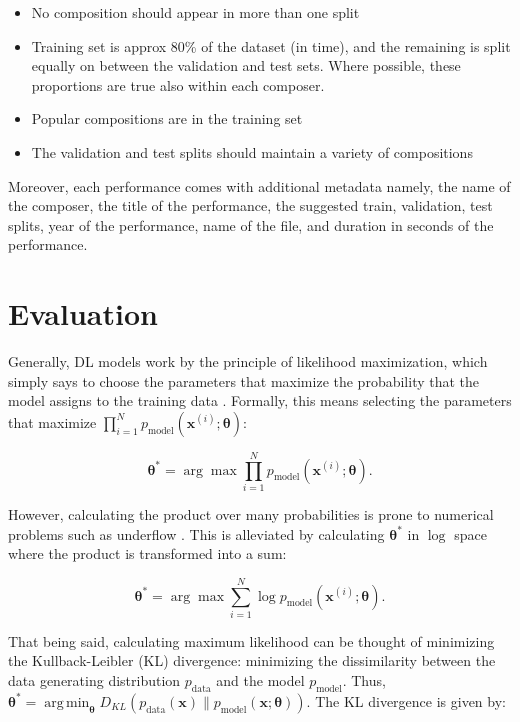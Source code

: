 \documentclass[a4paper]{book}
\DeclareMathOperator*{\argmin}{arg\,min}
\begin{document}
\begin{itemize}
    \item No composition should appear in more than one split
    \item Training set is approx 80\% of the dataset (in time), and the remaining is split equally on between the validation and test sets. Where possible, these proportions are true also within each composer.
    \item Popular compositions are in the training set
    \item The validation and test splits should maintain a variety of compositions
\end{itemize}

Moreover, each performance comes with additional metadata namely, the name of the composer, the title of the performance, the suggested train, validation, test splits, year of the performance, name of the file, and duration in seconds of the performance.

\section{Evaluation}

Generally, DL models work by the principle of likelihood maximization, which simply says to choose the parameters that maximize the probability that the model assigns to the training data \parencite{goodfellow_nips_2016}. Formally, this means selecting the parameters that maximize $\prod_{i=1}^N p_{\text{model}}(\bm{x}^{(i)}; \bm{\theta})$:

\begin{equation}
    \bm{\theta^*} = \arg \max \prod_{i=1}^N p_{\text{model}}(\bm{x}^{(i)}; \bm{\theta}) \label{eq:og_mle}.
\end{equation}

However, calculating the product over many probabilities is prone to numerical problems such as underflow \parencite{goodfellow_nips_2016}. This is alleviated by calculating $\bm{\theta^*}$ in $\log$ space where the product is transformed into a sum:

\begin{equation}
    \bm{\theta^*} = \arg \max \sum_{i=1}^N \log p_{\text{model}}(\bm{x}^{(i)}; \bm{\theta}) \label{eg:log_mle}.
\end{equation}

That being said, calculating maximum likelihood can be thought of minimizing the Kullback-Leibler (KL) divergence: minimizing the dissimilarity between the data generating distribution $p_{\text{data}}$ and the model $p_{\text{model}}$. Thus, $\bm{\theta^*} = \argmin_{\bm{\theta}} D_{KL}(p_{\text{data}}(\bm{x}) \| p_{\text{model}} (\bm{x}; \bm{\theta}))$. The KL divergence is given by:
\end{document}
